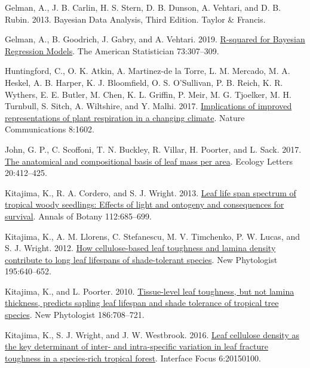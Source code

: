 \documentclass[
  12pt,
  a4paper,
,tablecaptionabove
]{scrartcl}
\newlength{\cslhangindent}
\newenvironment{CSLReferences}[2] %
 {%
  \setlength{\parindent}{0pt}
  \ifodd #1 \everypar{\setlength{\hangindent}{\cslhangindent}}\ignorespaces\fi
  \ifnum #2 > 0
  \setlength{\parskip}{#2\baselineskip}
  \fi
 }%
 {}
\begin{document}
\begin{CSLReferences}{1}{0}
\leavevmode{}%
Gelman, A., J. B. Carlin, H. S. Stern, D. B. Dunson, A. Vehtari, and D. B. Rubin. 2013. Bayesian {Data Analysis}, {Third Edition}. {Taylor \& Francis}.

\leavevmode{}%
Gelman, A., B. Goodrich, J. Gabry, and A. Vehtari. 2019. \href{https://doi.org/10.1080/00031305.2018.1549100}{R-squared for {Bayesian Regression Models}}. The American Statistician 73:307--309.

\leavevmode{}%
Huntingford, C., O. K. Atkin, A. Martinez-de la Torre, L. M. Mercado, M. A. Heskel, A. B. Harper, K. J. Bloomfield, O. S. O'Sullivan, P. B. Reich, K. R. Wythers, E. E. Butler, M. Chen, K. L. Griffin, P. Meir, M. G. Tjoelker, M. H. Turnbull, S. Sitch, A. Wiltshire, and Y. Malhi. 2017. \href{https://doi.org/10.1038/s41467-017-01774-z}{Implications of improved representations of plant respiration in a changing climate}. Nature Communications 8:1602.

\leavevmode{}%
John, G. P., C. Scoffoni, T. N. Buckley, R. Villar, H. Poorter, and L. Sack. 2017. \href{https://doi.org/10.1111/ele.12739}{The anatomical and compositional basis of leaf mass per area}. Ecology Letters 20:412--425.

\leavevmode{}%
Kitajima, K., R. A. Cordero, and S. J. Wright. 2013. \href{https://doi.org/10.1093/aob/mct036}{Leaf life span spectrum of tropical woody seedlings: {Effects} of light and ontogeny and consequences for survival}. Annals of Botany 112:685--699.

\leavevmode{}%
Kitajima, K., A. M. Llorens, C. Stefanescu, M. V. Timchenko, P. W. Lucas, and S. J. Wright. 2012. \href{https://doi.org/10.1111/j.1469-8137.2012.04203.x}{How cellulose-based leaf toughness and lamina density contribute to long leaf lifespans of shade-tolerant species}. New Phytologist 195:640--652.

\leavevmode{}%
Kitajima, K., and L. Poorter. 2010. \href{https://doi.org/10.1111/j.1469-8137.2010.03212.x}{Tissue-level leaf toughness, but not lamina thickness, predicts sapling leaf lifespan and shade tolerance of tropical tree species}. New Phytologist 186:708--721.

\leavevmode{}%
Kitajima, K., S. J. Wright, and J. W. Westbrook. 2016. \href{https://doi.org/10.1098/rsfs.2015.0100}{Leaf cellulose density as the key determinant of inter- and intra-specific variation in leaf fracture toughness in a species-rich tropical forest}. Interface Focus 6:20150100.


\end{CSLReferences}
\end{document}
